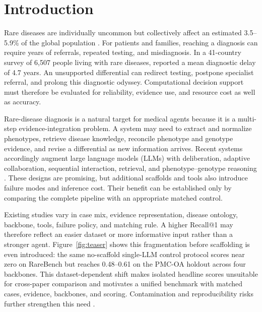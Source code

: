 \documentclass[letterpaper]{article} %
\begin{document}


\section{Introduction}
\label{sec:introduction}

Rare diseases are individually uncommon but collectively affect an estimated
3.5--5.9\% of the global population
\citep{NguengangWakap2020Prevalence}. For patients and families, reaching a
diagnosis can require years of referrals, repeated testing, and
misdiagnosis. In a 41-country survey of 6,507 people living with rare
diseases, \citet{Faye2024DiagnosisDelay} reported a mean diagnostic delay of
4.7 years. An unsupported differential can redirect testing, postpone
specialist referral, and prolong this diagnostic odyssey. Computational
decision support must therefore be evaluated for reliability, evidence use,
and resource cost as well as accuracy.

Rare-disease diagnosis is a natural target for medical agents because it is a
multi-step evidence-integration problem. A system may need to extract and
normalize phenotypes, retrieve disease knowledge, reconcile phenotype and
genotype evidence, and revise a differential as new information arrives.
Recent systems accordingly augment large language models (LLMs) with
deliberation, adaptive collaboration, sequential interaction, retrieval, and
phenotype--genotype reasoning
\citep{tang2024medagents,kim2024mdagents,nori2025sequential,
schmidgall2026agentclinic,zhao2026deeprare,liu2026vcrdagent}. These designs
are promising, but additional scaffolds and tools also introduce failure
modes and inference cost. Their benefit can be established only by comparing
the complete pipeline with an appropriate matched control.

Existing studies vary in case mix, evidence representation, disease ontology,
backbone, tools, failure policy, and matching rule. A higher Recall@1 may
therefore reflect an easier dataset or more informative input rather than a
stronger agent. Figure~\ref{fig:teaser} shows this fragmentation before
scaffolding is even introduced: the same no-scaffold single-LLM control protocol scores near zero
on RareBench but reaches 0.48--0.61 on the PMC-OA holdout across four
backbones. This dataset-dependent shift makes isolated headline scores
unsuitable for cross-paper comparison and motivates a unified benchmark with
matched cases, evidence, backbones, and scoring. Contamination and
reproducibility risks further strengthen this need
\citep{nguyen2026diagnostic}.
\end{document}
